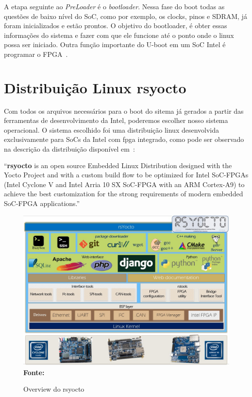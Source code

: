 A etapa seguinte ao \textit{PreLoader} é o \textit{bootloader}. Nessa fase do boot todas as questões de baixo nível do SoC, como por exemplo, os clocks, pinos e SDRAM, já foram inicializados e estão prontos. O objetivo do bootloader, é obter essas informações do sistema e fazer com que ele funcione até o ponto onde o linux possa ser iniciado. Outra função importante do U-boot em um SoC Intel é programar o FPGA~\cite{SocLinux}.

\section{Distribuição Linux rsyocto}
Com todos os arquivos necessários para o boot do sitema já gerados a partir das ferramentas de desenvolvimento da Intel, poderemos escolher nosso sistema operacional. O sistema escolhido foi uma distribuição linux desenvolvida exclusivamente para SoCs da Intel com fpga integrado, como pode ser observado na descrição da distribuição disponível em~\cite{rsyocto}:

\begin{citacao}
	``\textbf{rsyocto} is an open source Embedded Linux Distribution designed with the Yocto Project and with a custom build flow to be optimized for Intel SoC-FPGAs (Intel Cyclone V and Intel Arria 10 SX SoC-FPGA with an ARM Cortex-A9) to achieve the best customization for the strong requirements of modern embedded SoC-FPGA applications.''
\end{citacao} 

\begin{figure}[ht]
	\caption{Overview do rsyocto}
	\begin{center}
		\includegraphics[scale=0.45]{imagens/rsYoctoLayers.jpg}\\
		{\small \textbf{Fonte:}\cite{rsyocto}}
    \end{center}\label{fig:rsyocto}
\end{figure}

